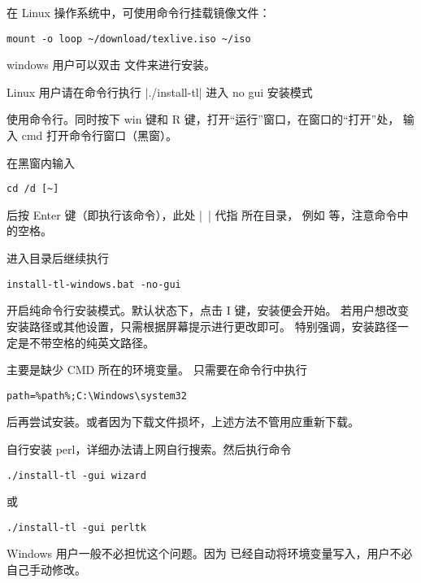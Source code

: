 在 Linux 操作系统中，可使用命令行挂载镜像文件：
\begin{verbatim}
mount -o loop ~/download/texlive.iso ~/iso
\end{verbatim}



windows 用户可以双击  文件来进行安装。

Linux 用户请在命令行执行 |./install-tl| 进入 no gui 安装模式



使用命令行。同时按下 win 键和 R 键，打开“运行”窗口，在窗口的“打开”处，
输入 cmd 打开命令行窗口（黑窗）。

在黑窗内输入
\begin{verbatim}
cd /d [~]
\end{verbatim}

后按 Enter 键（即执行该命令），此处 |~| 代指  所在目录，
例如  等，注意命令中的空格。

进入目录后继续执行
\begin{verbatim}
install-tl-windows.bat -no-gui
\end{verbatim}

开启纯命令行安装模式。默认状态下，点击 I 键，安装便会开始。
若用户想改变安装路径或其他设置，只需根据屏幕提示进行更改即可。
特别强调，安装路径一定是不带空格的纯英文路径。



主要是缺少 CMD 所在的环境变量。 只需要在命令行中执行
\begin{verbatim}
path=%path%;C:\Windows\system32
\end{verbatim}
后再尝试安装。或者因为下载文件损坏，上述方法不管用应重新下载。



自行安装 perl，详细办法请上网自行搜索。然后执行命令
\begin{verbatim}
./install-tl -gui wizard
\end{verbatim}
或
\begin{verbatim}
./install-tl -gui perltk
\end{verbatim}



Windows 用户一般不必担忧这个问题。因为 \TeXLive{} 已经自动将环境变量写入，用户不必自己手动修改。

